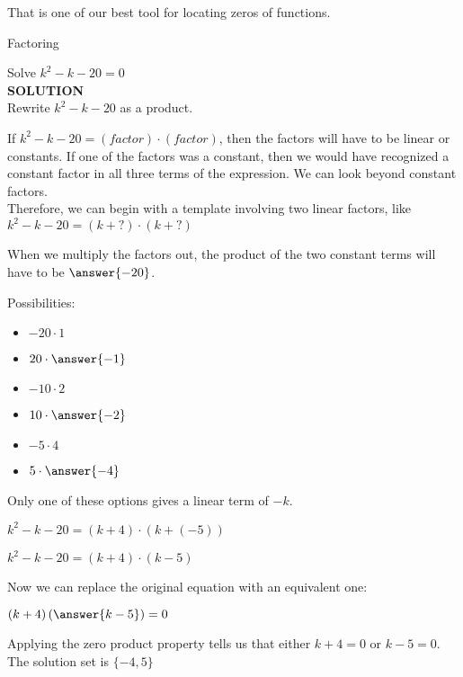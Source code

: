 \documentclass{ximera}
\begin{document}
That is one of our best tool for locating zeros of functions. \\



\begin{example} Factoring

Solve $k^2 - k - 20 = 0$ \\

\textbf{\textcolor{purple!50!blue!90!black}{SOLUTION}} \\



Rewrite $k^2 - k - 20$ as a product.

If $k^2 - k - 20 = (factor) \cdot (factor)$, then the factors will have to be linear or constants.  If one of the factors was a constant, then we would have recognized a constant factor in all three terms of the expression.  We can look beyond constant factors. \\

Therefore, we can begin with a template involving two linear factors, like $k^2 - k - 20 = (k + ?) \cdot (k + ?)$

When we multiply the factors out, the product of the two constant terms will have to be $\answer{-20}$.

Possibilities:
\begin{itemize}
\item $-20 \cdot 1$
\item $20 \cdot \answer{-1}$
\item $-10 \cdot 2$
\item $10 \cdot \answer{-2}$
\item $-5 \cdot 4$
\item $5 \cdot \answer{-4}$
\end{itemize}



Only one of these options gives a linear term of $-k$.


$k^2 - k - 20 = (k + 4) \cdot (k + (-5))$

$k^2 - k - 20 = (k + 4) \cdot (k - 5)$



Now we can replace the original equation with an equivalent one:


$(k + 4) \left( \answer{k - 5} \right) = 0$



Applying the zero product property tells us that either $k + 4 = 0$ or $k - 5 = 0$.  \\

The solution set is $\{ -4, 5 \}$





\end{example}
\end{document}
